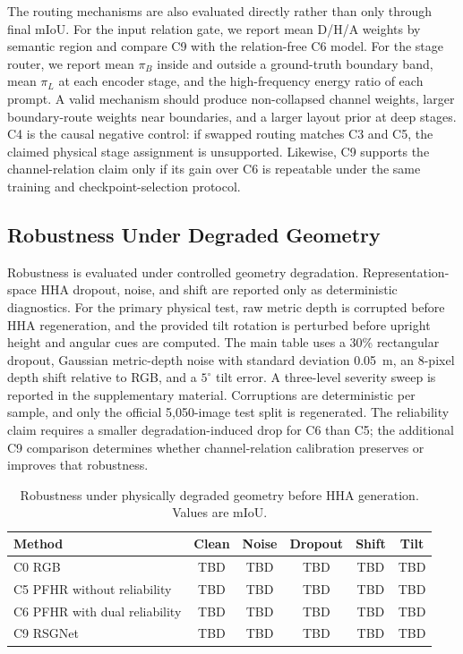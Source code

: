 \documentclass[a4paper,fleqn]{cas-dc}
\begin{document}
The routing mechanisms are also evaluated directly rather than only through final mIoU. For the input relation gate, we report mean D/H/A weights by semantic region and compare C9 with the relation-free C6 model. For the stage router, we report mean $\pi_B$ inside and outside a ground-truth boundary band, mean $\pi_L$ at each encoder stage, and the high-frequency energy ratio of each prompt. A valid mechanism should produce non-collapsed channel weights, larger boundary-route weights near boundaries, and a larger layout prior at deep stages. C4 is the causal negative control: if swapped routing matches C3 and C5, the claimed physical stage assignment is unsupported. Likewise, C9 supports the channel-relation claim only if its gain over C6 is repeatable under the same training and checkpoint-selection protocol.

\subsection{Robustness Under Degraded Geometry}

Robustness is evaluated under controlled geometry degradation. Representation-space HHA dropout, noise, and shift are reported only as deterministic diagnostics. For the primary physical test, raw metric depth is corrupted before HHA regeneration, and the provided tilt rotation is perturbed before upright height and angular cues are computed. The main table uses a 30\% rectangular dropout, Gaussian metric-depth noise with standard deviation 0.05~m, an 8-pixel depth shift relative to RGB, and a $5^{\circ}$ tilt error. A three-level severity sweep is reported in the supplementary material. Corruptions are deterministic per sample, and only the official 5,050-image test split is regenerated. The reliability claim requires a smaller degradation-induced drop for C6 than C5; the additional C9 comparison determines whether channel-relation calibration preserves or improves that robustness.

\begin{table}%
\caption{Robustness under physically degraded geometry before HHA generation. Values are mIoU.}\label{tab:robust}
\begin{tabular*}{\tblwidth}{@{\extracolsep{\fill}}lccccc@{}}
\toprule
Method & Clean & Noise & Dropout & Shift & Tilt \\
\midrule
C0 RGB & TBD & TBD & TBD & TBD & TBD \\
C5 PFHR without reliability & TBD & TBD & TBD & TBD & TBD \\
C6 PFHR with dual reliability & TBD & TBD & TBD & TBD & TBD \\
C9 RSGNet & TBD & TBD & TBD & TBD & TBD \\
\bottomrule
\end{tabular*}
\end{table}
\end{document}

